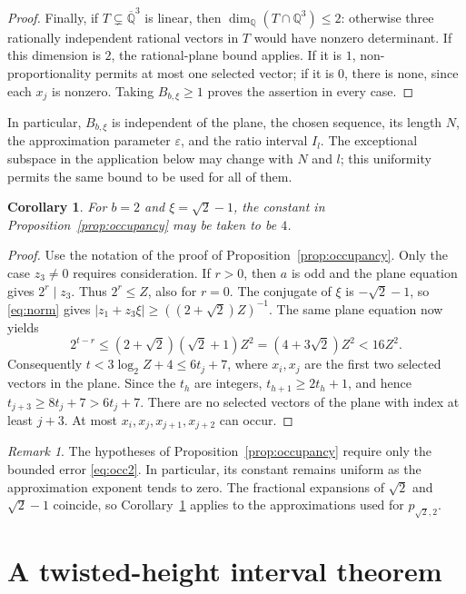 \documentclass[11pt]{article}
\numberwithin{equation}{section}
\newtheorem{corollary}[theorem]{Corollary}
\theoremstyle{remark}
\newtheorem{remark}[theorem]{Remark}
\newcommand{\Q}{\mathbb Q}
\newcommand{\Qbar}{\overline{\mathbb Q}}
\newcommand{\eps}{\varepsilon}
\begin{document}
\begin{proof}
Finally, if $T\subsetneq\Qbar^3$ is linear, then
$\dim_\Q(T\cap\Q^3)\le2$: otherwise three rationally independent
rational vectors in $T$ would have nonzero determinant.
If this dimension is $2$, the rational-plane bound applies.
If it is $1$, non-proportionality permits at most one selected vector;
if it is $0$, there is none, since each $x_j$ is nonzero.
Taking $B_{b,\xi}\ge1$ proves the assertion in every case.
\end{proof}

In particular, $B_{b,\xi}$ is independent of the plane, the chosen
sequence, its length $N$, the approximation parameter $\eps$, and
the ratio interval $I_l$. The exceptional subspace in the application
below may change with $N$ and $l$; this uniformity permits the same
bound to be used for all of them.

\begin{corollary}\label{cor:four}
For $b=2$ and $\xi=\sqrt2-1$, the constant in
Proposition~\ref{prop:occupancy} may be taken to be $4$.
\end{corollary}
\begin{proof}
Use the notation of the proof of Proposition~\ref{prop:occupancy}.
Only the case $z_3\ne0$ requires consideration.
If $r>0$, then $a$ is odd and the plane equation gives $2^r\mid z_3$.
Thus $2^r\le Z$, also for $r=0$.
The conjugate of $\xi$ is $-\sqrt2-1$, so \eqref{eq:norm} gives
$|z_1+z_3\xi|\ge((2+\sqrt2)Z)^{-1}$.
The same plane equation now yields
\[
 2^{t-r}
 \le(2+\sqrt2)(\sqrt2+1)Z^2
 =(4+3\sqrt2)Z^2<16Z^2.
\]
Consequently $t<3\log_2 Z+4\le6t_j+7$, where $x_i,x_j$ are the first
two selected vectors in the plane. Since the $t_h$ are integers,
$t_{h+1}\ge2t_h+1$, and hence
$t_{j+3}\ge8t_j+7>6t_j+7$.
There are no selected vectors of the plane with index at least $j+3$.
At most $x_i,x_j,x_{j+1},x_{j+2}$ can occur.
\end{proof}

\begin{remark}
The hypotheses of Proposition~\ref{prop:occupancy} require only the
bounded error \eqref{eq:occ2}. In particular, its constant remains
uniform as the approximation exponent tends to zero.
The fractional expansions of $\sqrt2$ and $\sqrt2-1$ coincide, so
Corollary~\ref{cor:four} applies to the approximations used for
$p_{\sqrt2,2}$.
\end{remark}

\section{A twisted-height interval theorem}\label{sec:EF}
\end{document}
